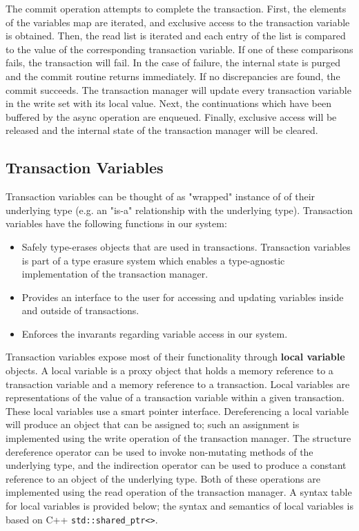 \documentclass[conference]{IEEEtran}
\begin{document}
The commit operation attempts to complete the transaction. First, the elements of the variables map are iterated, and exclusive access to the transaction variable is obtained. Then, the read list is iterated and each entry of the list is compared to the value of the corresponding transaction variable. If one of these comparisons fails, the transaction will fail. In the case of failure, the internal state is purged and the commit routine returns immediately. If no discrepancies are found, the commit succeeds. The transaction manager will update every transaction variable in the write set with its local value. Next, the continuations which have been buffered by the async operation are enqueued. Finally, exclusive access will be released and the internal state of the transaction manager will be cleared.

\subsection{Transaction Variables}

Transaction variables can be thought of as "wrapped" instance of of their underlying type (e.g. an "is-a" relationship with the underlying type). Transaction variables have the following functions in our system:

\begin{itemize}
\item Safely type-erases objects that are used in transactions. Transaction variables is
part of a type erasure system which enables a type-agnostic implementation of
the transaction manager.
\item Provides an interface to the user for accessing and updating variables
inside and outside of transactions.
\item Enforces the invarants regarding variable access in our system.
\end{itemize}

Transaction variables expose most of their functionality through \textbf{local variable} objects. A local variable is a proxy object that holds a memory reference to a transaction variable and a memory reference to a transaction. Local variables are representations of the value of a transaction variable within a given transaction. These local variables use a smart pointer interface. Dereferencing a local variable will produce an object that can be assigned to; such an assignment is implemented using the write operation of the transaction manager. The structure dereference operator can be used to invoke non-mutating methods of the underlying type, and the indirection operator can be used to produce a constant reference to an object of the underlying type. Both of these operations are implemented using the read operation of the transaction manager. A syntax table for local variables is provided below; the syntax and semantics of local variables is based on C++ \lstinline$std::shared_ptr<>$.
\end{document}
